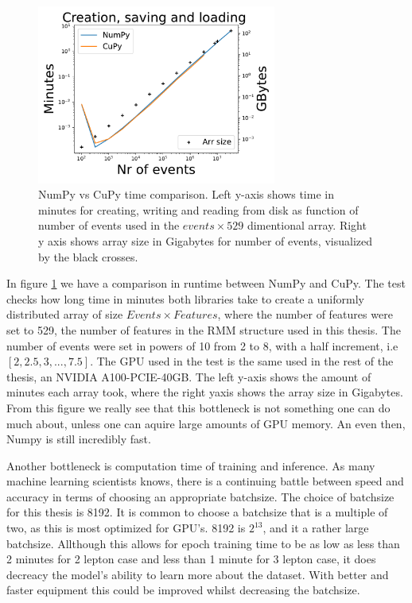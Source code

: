 \begin{figure}[H]
    \caption[NumPy vs CuPy time comparison]{NumPy vs CuPy time comparison. Left y-axis shows time in minutes for 
    creating, writing and reading from disk as function of number of events used in the $events\times 529$ dimentional array. 
    Right y axis shows array size in Gigabytes for number of events, visualized by the black crosses. }
    \label{fig:cupy_comp}
    \centering
    \includegraphics[width=0.7\textwidth]{Figures/atlas/cupy_testing.pdf}
\end{figure}

In figure \ref{fig:cupy_comp} we have a comparison in runtime between NumPy and CuPy. The test checks how long time 
in minutes both libraries take to create a uniformly distributed array of size $Events\times Features$, where the 
number of features were set to 529, the number of features in the RMM structure used in this thesis. The number of events 
were set in powers of 10 from 2 to 8, with a half increment, i.e $[2, 2.5, 3, ..., 7.5]$. The GPU used in the test 
is the same used in the rest of the thesis, an NVIDIA A100-PCIE-40GB. The left y-axis shows the amount of minutes 
each array took, where the right yaxis shows the array size in Gigabytes. From this figure we really see that this 
bottleneck is not something one can do much about, unless one can aquire large amounts of GPU memory. An even then, 
Numpy is still incredibly fast. \par 
Another bottleneck is computation time of training and inference. As many machine learning scientists knows, 
there is a continuing battle between speed and accuracy in terms of choosing an appropriate batchsize. 
The choice of batchsize for this thesis is 8192. It is common to choose a batchsize that is a multiple of two, 
as this is most optimized for GPU's. 8192 is $2^{13}$, and it a rather large batchsize. Allthough this allows for 
epoch training time to be as low as less than 2 minutes for 2 lepton case and less than 1 minute for 3 lepton case,
it does decreacy the model's ability to learn more about the dataset. With better and faster equipment this could 
be improved whilst decreasing the batchsize. 


